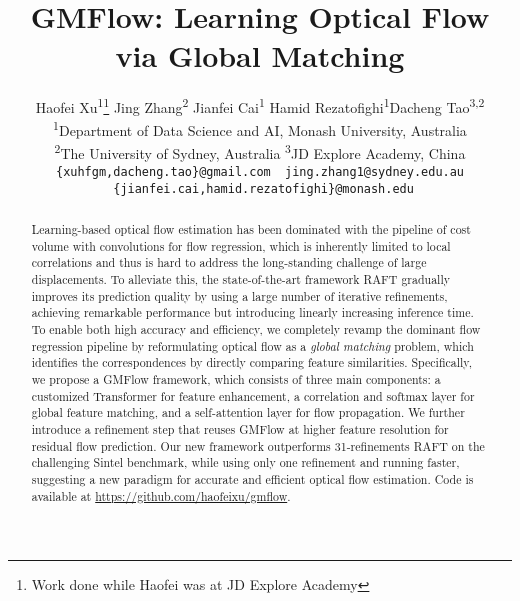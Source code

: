 \documentclass[10pt,twocolumn,letterpaper]{article}
\begin{document}
\title{GMFlow: Learning Optical Flow via Global Matching}


\author{{Haofei Xu\textsuperscript{1}\thanks{Work done while Haofei was at JD Explore Academy} \quad Jing Zhang\textsuperscript{2} \quad Jianfei Cai\textsuperscript{1}  \quad Hamid Rezatofighi\textsuperscript{1}\quad Dacheng Tao\textsuperscript{3,2}} \\
{\normalsize \textsuperscript{1}Department of Data Science and AI, Monash University, Australia}
\\
{\normalsize \textsuperscript{2}The University of Sydney, Australia}
\quad 
{\normalsize \textsuperscript{3}JD Explore Academy, China}\\
{\tt\footnotesize \{xuhfgm,dacheng.tao\}@gmail.com \ jing.zhang1@sydney.edu.au \ \{jianfei.cai,hamid.rezatofighi\}@monash.edu}
}


\maketitle

\begin{abstract}


Learning-based optical flow estimation has been dominated with the pipeline of cost volume with convolutions for flow regression, which is inherently limited to local correlations and thus is hard to address the long-standing challenge of large displacements. To alleviate this, the state-of-the-art framework RAFT gradually improves its prediction quality by using a large number of iterative refinements, achieving remarkable performance but introducing linearly increasing inference time. To enable both high accuracy and efficiency, we completely revamp the dominant flow regression pipeline by reformulating optical flow as a \emph{global matching} problem, which identifies the correspondences by directly comparing feature similarities. Specifically, we propose a GMFlow framework, which consists of three main components: a customized Transformer for feature enhancement, a correlation and softmax layer for global feature matching, and a self-attention layer for flow propagation. We further introduce a refinement step that reuses GMFlow at higher feature resolution for residual flow prediction. Our new framework outperforms 31-refinements RAFT on the challenging Sintel benchmark, while using only one refinement and running faster, suggesting a new paradigm for accurate and efficient optical flow estimation. Code is available at \href{https://github.com/haofeixu/gmflow}{https://github.com/haofeixu/gmflow}.

















   
\end{abstract}
\end{document}
